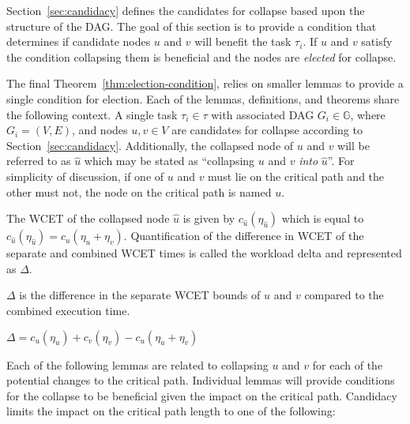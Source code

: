 Section~\ref{sec:candidacy} defines the candidates for
collapse based upon the structure of the DAG. The goal of this section
is to provide a condition that determines if candidate nodes ${u}$ and
${v}$ will benefit the task ${\tau_i}$. If ${u}$ and ${v}$ satisfy the
condition collapsing them  is beneficial and the nodes are
\emph{elected} for collapse.

The final Theorem~\ref{thm:election-condition}, relies on smaller
lemmas to provide a single condition for election. Each of the lemmas,
definitions, and theorems share the following context. A single task
${\tau_i \in \tau}$ with associated DAG ${G_i \in \mathbb{G}}$, where
${G_i = (V, E)}$, and nodes ${u,v \in V}$ are candidates for collapse
according to Section~\ref{sec:candidacy}. Additionally, the collapsed
node of ${u}$ and ${v}$ will be referred to as ${\hat{u}}$ which may
be stated as ``collapsing ${u}$ and ${v}$ \emph{into}
${\hat{u}}$''. For simplicity of discussion, if one of ${u}$ and ${v}$
must lie on the critical path and the other must not, the node on the
critical path is named ${u}$.

The WCET of the collapsed node ${\hat{u}}$ is given by
${c_{\hat{u}}(\eta_{\hat{u}})}$ which is equal to
${c_{\hat{u}}(\eta_{\hat{u}}) = c_u(\eta_u + \eta_v)}$. Quantification
of the difference in WCET of the separate and combined WCET times is
called the workload delta and represented as ${\Delta}$.

\begin{definition}
  ${\Delta}$ is the difference in the separate WCET bounds of
  ${u}$ and ${v}$ compared to the combined execution time. 

  ${\Delta = c_u(\eta_u) + c_v(\eta_v) - c_u(\eta_u + \eta_v)}$
\end{definition}

Each of the following lemmas are related to collapsing ${u}$ and ${v}$
for each of the potential changes to the critical path. Individual
lemmas will provide conditions for the collapse to be beneficial given
the impact on the critical path. Candidacy limits the impact on the
critical path length to one of the following:


